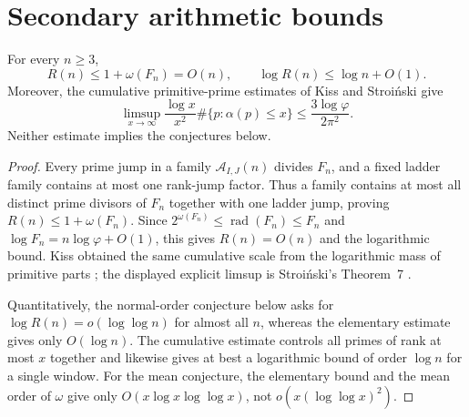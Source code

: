 \section{Secondary arithmetic bounds}
\label{sec:supp-arithmetic-bounds}

\begin{lemma}
\label{lem:R-baseline}
For every $n\ge3$,
\[
 R(n)\le 1+\omega(F_n)=O(n),
 \qquad
 \log R(n)\le\log n+O(1).
\]
Moreover, the cumulative primitive-prime estimates of Kiss and Stroi\'nski
give
\[
 \limsup_{x\to\infty}\frac{\log x}{x^2}
 \#\{p:\alpha(p)\le x\}
 \le \frac{3\log\varphi}{2\pi^2}.
\]
Neither estimate implies the conjectures below.
\end{lemma}

\begin{proof}
Every prime jump in a family $\mathcal A_{I,J}(n)$ divides $F_n$, and a fixed
ladder family contains at most one rank-jump factor. Thus a family contains at most all
distinct prime divisors of $F_n$ together with one ladder jump, proving
$R(n)\le1+\omega(F_n)$. Since
$2^{\omega(F_n)}\le\operatorname{rad}(F_n)\le F_n$ and
$\log F_n=n\log\varphi+O(1)$, this gives $R(n)=O(n)$ and the logarithmic
bound. Kiss obtained the same cumulative scale from the logarithmic mass of
primitive parts \cite{Kiss1988PrimitiveDivisors}; the displayed explicit
limsup is Stroi\'nski's Theorem~7
\cite{Stroinski2016AlphaContraction}.

Quantitatively, the normal-order conjecture below asks for
$\log R(n)=o(\log\log n)$ for almost all $n$, whereas the elementary estimate
gives only $O(\log n)$. The cumulative estimate controls all primes of rank at
most $x$ together and likewise gives at best a logarithmic bound of order
$\log n$ for a single window. For the mean conjecture, the elementary bound
and the mean order of $\omega$ give only
$O(x\log x\log\log x)$, not $o(x(\log\log x)^2)$.
\end{proof}

